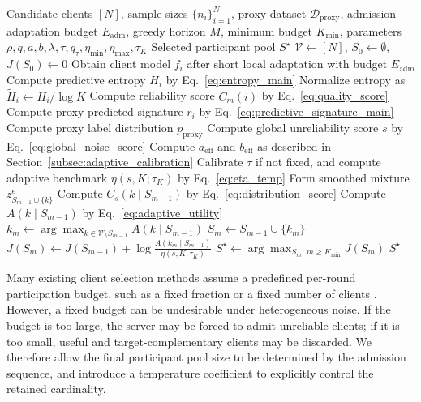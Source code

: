 \documentclass[conference]{IEEEtran}
\theoremstyle{definition}
\theoremstyle{remark}
\begin{document}
\begin{algorithm}[t]
\caption{FedRAA: Fixed-Scale Noise-Adaptive Client Admission}
\label{alg:FedRAA}
\begin{algorithmic}[1]
\Require Candidate clients $[N]$, sample sizes $\{n_i\}_{i=1}^N$, proxy dataset $\mathcal D_{\mathrm{proxy}}$, admission adaptation budget $E_{\mathrm{adm}}$, greedy horizon $M$, minimum budget $K_{\min}$, parameters $\rho,q,a,b,\lambda,\tau,q_\tau,\eta_{\min},\eta_{\max},\tau_K$
\Ensure Selected participant pool $S^\star$
\State $\mathcal V\leftarrow[N]$, $S_0\leftarrow\emptyset$, $J(S_0)\leftarrow0$
    \State Obtain client model $f_i$ after short local adaptation with budget $E_{\mathrm{adm}}$
    \State Compute predictive entropy $H_i$ by Eq.~\eqref{eq:entropy_main}
    \State Normalize entropy as $\widetilde H_i\leftarrow H_i/\log K$
    \State Compute reliability score $C_m(i)$ by Eq.~\eqref{eq:quality_score}
    \State Compute proxy-predicted signature $r_i$ by Eq.~\eqref{eq:predictive_signature_main}
\EndFor
\State Compute proxy label distribution $p_{\mathrm{proxy}}$
\State Compute global unreliability score $s$ by Eq.~\eqref{eq:global_noise_score}
\State Compute $a_{\mathrm{eff}}$ and $b_{\mathrm{eff}}$ as described in Section~\ref{subsec:adaptive_calibration}
\State Calibrate $\tau$ if not fixed, and compute adaptive benchmark $\eta(s,K;\tau_K)$ by Eq.~\eqref{eq:eta_temp}
        \State Form smoothed mixture $z_{S_{m-1}\cup\{k\}}^\epsilon$
        \State Compute $C_s(k\mid S_{m-1})$ by Eq.~\eqref{eq:distribution_score}
        \State Compute $A(k\mid S_{m-1})$ by Eq.~\eqref{eq:adaptive_utility}
    \EndFor
    \State $k_m\leftarrow\arg\max_{k\in\mathcal V\setminus S_{m-1}}A(k\mid S_{m-1})$
    \State $S_m\leftarrow S_{m-1}\cup\{k_m\}$
    \State $J(S_m)\leftarrow J(S_{m-1})+\log\frac{A(k_m\mid S_{m-1})}{\eta(s,K;\tau_K)}$
\EndFor
\State $S^\star\leftarrow \arg\max_{S_m:\,m\ge K_{\min}}J(S_m)$
\State \Return $S^\star$
\end{algorithmic}
\end{algorithm}

Many existing client selection methods assume a predefined per-round
participation budget, such as a fixed fraction or a fixed number of clients
\cite{mcmahan2017communication, lai2021oort, cho2022power}.
However, a fixed budget can be undesirable under heterogeneous noise.
If the budget is too large, the server may be forced to admit unreliable clients; if it is too small, useful and target-complementary clients may be discarded.
We therefore allow the final participant pool size to be determined by the admission sequence, and introduce a temperature coefficient to explicitly control the retained cardinality.
\end{document}
